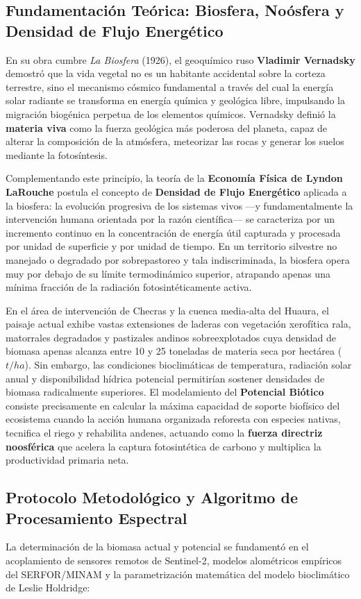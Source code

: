 \documentclass[11pt,a4paper]{article}
\begin{document}
\subsection{Fundamentación Teórica: Biosfera, Noósfera y Densidad de Flujo Energético}
En su obra cumbre \textit{La Biosfera} (1926), el geoquímico ruso \textbf{Vladimir Vernadsky} demostró que la vida vegetal no es un habitante accidental sobre la corteza terrestre, sino el mecanismo cósmico fundamental a través del cual la energía solar radiante se transforma en energía química y geológica libre, impulsando la migración biogénica perpetua de los elementos químicos. Vernadsky definió la \textbf{materia viva} como la fuerza geológica más poderosa del planeta, capaz de alterar la composición de la atmósfera, meteorizar las rocas y generar los suelos mediante la fotosíntesis.

Complementando este principio, la teoría de la \textbf{Economía Física de Lyndon LaRouche} postula el concepto de \textbf{Densidad de Flujo Energético} aplicada a la biosfera: la evolución progresiva de los sistemas vivos —y fundamentalmente la intervención humana orientada por la razón científica— se caracteriza por un incremento continuo en la concentración de energía útil capturada y procesada por unidad de superficie y por unidad de tiempo. En un territorio silvestre no manejado o degradado por sobrepastoreo y tala indiscriminada, la biosfera opera muy por debajo de su límite termodinámico superior, atrapando apenas una mínima fracción de la radiación fotosintéticamente activa.

En el área de intervención de Checras y la cuenca media-alta del Huaura, el paisaje actual exhibe vastas extensiones de laderas con vegetación xerofítica rala, matorrales degradados y pastizales andinos sobreexplotados cuya densidad de biomasa apenas alcanza entre 10 y 25 toneladas de materia seca por hectárea ($t/ha$). Sin embargo, las condiciones bioclimáticas de temperatura, radiación solar anual y disponibilidad hídrica potencial permitirían sostener densidades de biomasa radicalmente superiores. El modelamiento del \textbf{Potencial Biótico} consiste precisamente en calcular la máxima capacidad de soporte biofísico del ecosistema cuando la acción humana organizada reforesta con especies nativas, tecnifica el riego y rehabilita andenes, actuando como la \textbf{fuerza directriz noosférica} que acelera la captura fotosintética de carbono y multiplica la productividad primaria neta.

\subsection{Protocolo Metodológico y Algoritmo de Procesamiento Espectral}
La determinación de la biomasa actual y potencial se fundamentó en el acoplamiento de sensores remotos de Sentinel-2, modelos alométricos empíricos del SERFOR/MINAM y la parametrización matemática del modelo bioclimático de Leslie Holdridge:
\end{document}
